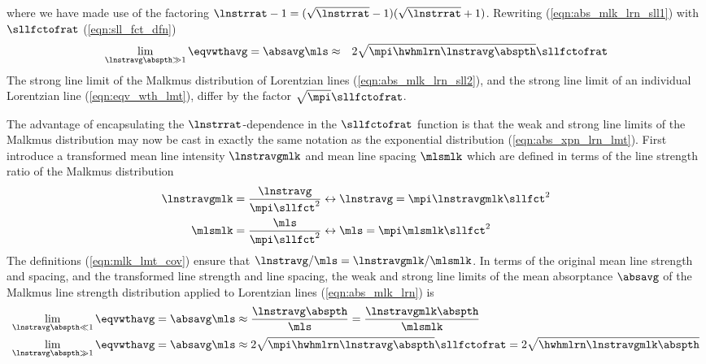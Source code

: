 \documentclass[12pt]{article}
\begin{document}
where we have made use of the factoring 
$\lnstrrat - 1 = (\sqrt{\lnstrrat} - 1)(\sqrt{\lnstrrat} + 1)$.
Rewriting (\ref{eqn:abs_mlk_lrn_sll1}) with $\sllfctofrat$
(\ref{eqn:sll_fct_dfn})
\begin{eqnarray}
\lim_{\lnstravg \abspth \gg 1} \eqvwthavg = \absavg \mls & \approx &
2\sqrt{\mpi \hwhmlrn \lnstravg \abspth} \sllfctofrat
\label{eqn:abs_mlk_lrn_sll2}
\end{eqnarray}
The strong line limit of the Malkmus distribution of Lorentzian lines  
(\ref{eqn:abs_mlk_lrn_sll2}), and the strong line limit of an
individual Lorentzian line (\ref{eqn:eqv_wth_lmt}), differ by the
factor $\sqrt{\mpi} \sllfctofrat$.

The advantage of encapsulating the $\lnstrrat$-dependence in the
$\sllfctofrat$ function is that the weak and strong line limits of the
Malkmus distribution may now be cast in exactly the same notation as
the exponential distribution (\ref{eqn:abs_xpn_lrn_lmt}). 
First introduce a transformed mean line intensity $\lnstravgmlk$ and
mean line spacing $\mlsmlk$ which are defined in terms of the line
strength ratio of the Malkmus distribution
\begin{subequations}
\label{eqn:mlk_lmt_cov}
\begin{align}
\label{eqn:lnstr_avg_mlk_dfn}
\lnstravgmlk & = \frac{\lnstravg}{\mpi \sllfct^{2}} \leftrightarrow 
\lnstravg = \mpi \lnstravgmlk \sllfct^{2} \\
\label{eqn:mls_mlk_dfn}
\mlsmlk & = \frac{\mls}{\mpi \sllfct^{2}} \leftrightarrow 
\mls = \mpi \mlsmlk \sllfct^{2}
\end{align}
\end{subequations}
The definitions (\ref{eqn:mlk_lmt_cov}) ensure that 
$\lnstravg/\mls = \lnstravgmlk/\mlsmlk$.
In terms of the original mean line strength and spacing, and the
transformed line strength and line spacing, the weak and strong line
limits of the mean absorptance $\absavg$ of the Malkmus line strength
distribution applied to Lorentzian lines (\ref{eqn:abs_mlk_lrn}) is
\begin{subequations}
\label{eqn:abs_mlk_lrn_lmt3}
\begin{align}
\label{eqn:abs_mlk_lrn_wll3}
\lim_{\lnstravg \abspth \ll 1} \eqvwthavg = \absavg \mls & \approx
\frac{\lnstravg \abspth}{\mls}
= \frac{\lnstravgmlk \abspth}{\mlsmlk} \\
\label{eqn:abs_mlk_lrn_sll3}
\lim_{\lnstravg \abspth \gg 1} \eqvwthavg = \absavg \mls & \approx
2\sqrt{\mpi \hwhmlrn \lnstravg \abspth} \sllfctofrat
= 2\sqrt{\hwhmlrn \lnstravgmlk \abspth}
\end{align}
\end{subequations}
\end{document}
